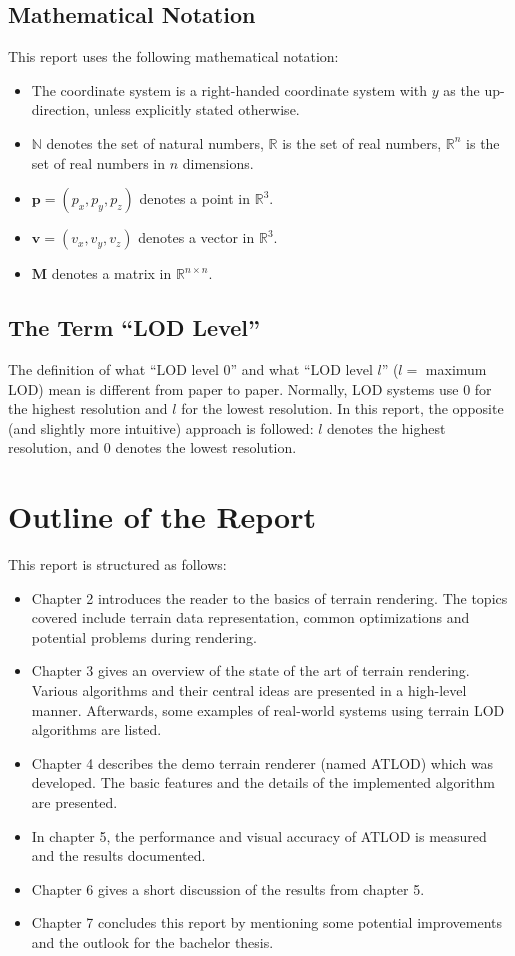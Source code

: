 \subsection{Mathematical Notation}
This report uses the following mathematical notation:
\begin{itemize}
      \item The coordinate system is a right-handed coordinate system with $y$ as the up-direction, unless explicitly stated otherwise.
      \item $\mathbb{N}$ denotes the set of natural numbers, $\mathbb{R}$ is the set of real numbers, $\mathbb{R}^n$ is the set of real numbers in $n$ dimensions.
      \item $\mathbf{p} = (p_x, p_y, p_z)$ denotes a point in $\mathbb{R}^3$.
      \item $\mathbf{v} = (v_x, v_y, v_z)$ denotes a vector in $\mathbb{R}^3$.
      \item $\mathbf{M}$ denotes a matrix in $\mathbb{R}^{n \times n}$.
\end{itemize}

\subsection{The Term ``LOD Level''}
The definition of what ``LOD level 0'' and what ``LOD level $l$'' ($l = $ maximum LOD) mean is different from paper to paper.
Normally, LOD systems use 0 for the highest resolution and $l$ for the lowest resolution.
In this report, the opposite (and slightly more intuitive) approach is followed: $l$ denotes the highest resolution, and 0 denotes the lowest resolution.

\section{Outline of the Report}
This report is structured as follows:
\begin{itemize}
  \item Chapter 2 introduces the reader to the basics of terrain rendering. The topics covered include 
        terrain data representation, common optimizations and potential problems during rendering.
  \item Chapter 3 gives an overview of the state of the art of terrain rendering.
        Various algorithms and their central ideas are presented in a high-level manner.
        Afterwards, some examples of real-world systems using terrain LOD algorithms are listed.
  \item Chapter 4 describes the demo terrain renderer (named ATLOD) which was developed.
        The basic features and the details of the implemented algorithm are presented.
  \item In chapter 5, the performance and visual accuracy of ATLOD is measured and the results documented.
  \item Chapter 6 gives a short discussion of the results from chapter 5.
  \item Chapter 7 concludes this report by mentioning some potential improvements and the 
        outlook for the bachelor thesis.
\end{itemize}


